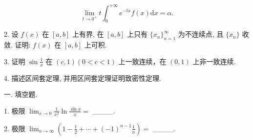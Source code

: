 \documentclass{examcollection}
\renewcommand{\displayformula}[1]{\[#1\]}
\begin{document}
{\begin{minipage}{\textwidth}
\displayformula{\lim _ {t \rightarrow 0 ^ {+}} t \int_ {0} ^ {+ \infty} e ^ {- t x} f (x) \mathrm{d} x = \alpha .}\par
2. 设 $f(x)$ 在 $[a, b]$ 上有界, 在 $[a, b]$ 上只有 $\{x_n\}_{n=1}^{\infty}$ 为不连续点, 且 $\{x_n\}$ 收敛. 证明: $f(x)$ 在 $[a, b]$ 上可积.\par
3. 证明 $\sin \frac{1}{x}$ 在 $(c,1)(0 < c < 1)$ 上一致连续，在 $(0,1)$ 上非一致连续.\par
4. 描述区间套定理, 并用区间套定理证明致密性定理.\par
{}\smallskip
一. 填空题.\par
1. 极限  $\lim_{x\to0}\frac{1}{x^{2}}\ln\frac{\sin x}{x}=$  \_\_\_\_.\par
2. 极限  $\lim_{n\to\infty}\left(1-\frac{1}{2}+\cdots+(-1)^{n-1}\frac{1}{n}\right)=$  \_\_\_\_.\par
\end{minipage}}
\ifdim\dimexpr\ht\proofbox+\dp\proofbox\relax>\textheight
\noindent\resizebox{!}{\textheight}{\usebox{\proofbox}}\else\noindent\usebox{\proofbox}\fi\clearpage
\end{document}
